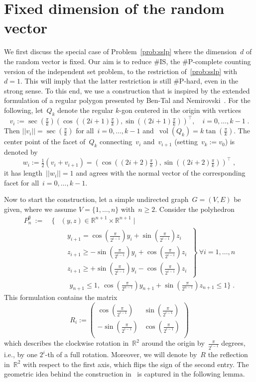 \documentclass{article}
\newcommand{\R}{\mathbb{R}}
\newcommand{\card}{\#}
\DeclareMathOperator{\vol}{vol}
\begin{document}
\section{Fixed dimension of the random vector}\label{sec:fixed_d}

We first discuss the special case of Problem~\eqref{prob:sslp} where
the dimension~$d$ of the random vector is fixed. Our aim is to reduce
\card IS, the \card P-complete counting version of the independent set
problem, to the restriction of~\eqref{prob:sslp} with~$d=1$. This will
imply that the latter restriction is still \card P-hard, even in the
strong sense. To this end, we use a construction that is inspired by
the extended formulation of a regular polygon presented by Ben-Tal and
Nemirovski~\cite{BenTal01}. For the following, let~$Q_k$ denote the
regular $k$-gon centered in the origin with vertices
\[
v_i:=\sec(\tfrac\pi k)(\cos((2i+1)\tfrac\pi k),\sin((2i+1)\tfrac\pi
k))^\top,\quad i=0,\dots,k-1\;.\] Then $||v_i||=\sec(\tfrac\pi k)$ for
all~$i=0,\dots,k-1$ and~$\vol(Q_{k})=k\tan(\tfrac\pi k)$.  The center
point of the facet of~$Q_k$ connecting~$v_i$ and~$v_{i+1}$
(setting~$v_{k}:=v_0$) is denoted by
\[
w_i:=\tfrac 12(v_i+v_{i+1})=(\cos((2i+2)\tfrac\pi
k),\sin((2i+2)\tfrac\pi k))^\top\;,\] it has length~$||w_i||=1$ and
agrees with the normal vector of the corresponding facet for
all~$i=0,\dots,k-1$.

Now to start the construction, let a simple undirected graph~$G=(V,E)$
be given, where we assume $V=\{1,\dots,n\}$ with~$n\ge 2$. Consider
the polyhedron
\begin{eqnarray*}
  P^\emptyset_n ~ := ~ & \big\{ & (y,z)\in\R^{n+1}\times\R^{n+1}\mid\\
  && \; \left.\begin{array}{l}
    \; y_{i+1} = \cos(\tfrac\pi{2^{i-1}})y_{i}+\sin(\tfrac\pi{2^{i-1}})z_{i}\\[1ex]
    \; z_{i+1} \ge -\sin(\tfrac\pi{2^{i-1}})y_{i}+\cos(\tfrac\pi{2^{i-1}})z_{i}\\[1ex]
    \; z_{i+1} \ge +\sin(\tfrac\pi{2^{i-1}})y_{i}-\cos(\tfrac\pi{2^{i-1}})z_{i}
  \end{array} ~ \right\} ~ \forall i=1,\dots,n\\
  &&\quad\;  y_{n+1} \le 1, ~ \cos(\tfrac\pi{2^{n-1}})y_{n+1}+\sin(\tfrac\pi{2^{n-1}})z_{n+1}\le 1\big\}\;.
\end{eqnarray*}
This formulation contains the matrix
\[
R_i:=\begin{pmatrix} \cos(\tfrac\pi{2^{i-1}}) &
\sin(\tfrac\pi{2^{i-1}})\\ -\sin(\tfrac\pi{2^{i-1}}) &
\cos(\tfrac\pi{2^{i-1}})\\
\end{pmatrix}
\]
which describes the clockwise rotation in~$\R^2$ around the origin
by~$\tfrac\pi{2^{i-1}}$ degrees, i.e., by one $2^i$-th of a full
rotation. Moreover, we will denote by~$R$ the reflection in~$\R^2$
with respect to the first axis, which flips the sign of the second
entry. The geometric idea behind the construction in~\cite{BenTal01}
is captured in the following lemma.
\end{document}
